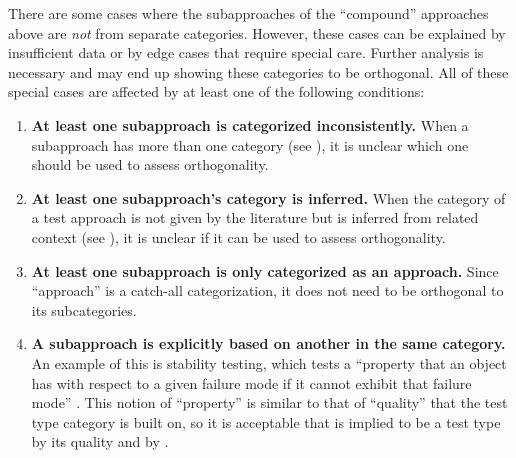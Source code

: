     There are some cases where the subapproaches of the ``compound'' approaches
    above are \emph{not} from separate categories. However, these cases can be
    explained by insufficient data or by edge cases that require special care.
    Further analysis is necessary and may end up showing these categories to be
    orthogonal. All of these special cases are affected by at least one of the
    following conditions:
    \begin{enumerate}
        \item \textbf{At least one subapproach is categorized inconsistently.}
              When a subapproach has more than one category (see ),
              it is unclear which one should be used to assess orthogonality.
        \item \textbf{At least one subapproach's category is inferred.} When the category
              of a test approach is not given by the literature but is inferred
              from related context (see ), it is unclear if it can
              be used to assess orthogonality.
        \item \textbf{At least one subapproach is only categorized as an approach.}
              Since ``approach'' is a catch-all categorization, it does not
              need to be orthogonal to its subcategories.
        \item \textbf{A subapproach is explicitly based on another in the same
                  category.} An example of this is stability testing, which
              tests a ``property that an object has with respect to a given
              failure mode if it cannot exhibit that failure mode''
              \citep[p.~434]{IEEE2017}. This notion of
              ``property'' is similar to that of ``quality'' that the test type
              category is built on, so it is acceptable that is implied to be
              a test type by its quality \citep[p.~434]{IEEE2017}%
               and by \citet[p.~55]{Firesmith2015}.
    \end{enumerate}
\fi

